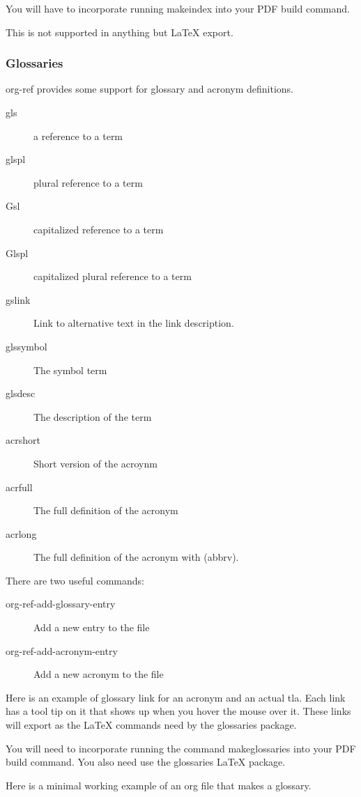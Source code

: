 \documentclass[11pt]{article}
\begin{document}
{You will have to incorporate running makeindex into your PDF build command.

This is not supported in anything but \LaTeX{} export.

\subsubsection{Glossaries}
\label{sec-3-3-5}

org-ref provides some support for glossary and acronym definitions.
\begin{description}
\item[{gls}] a reference to a term
\item[{glspl}] plural reference to a term
\item[{Gsl}] capitalized reference to a term
\item[{Glspl}] capitalized plural reference to a term
\item[{gslink}] Link to alternative text in the link description.
\item[{glssymbol}] The symbol term
\item[{glsdesc}] The description of the term

\item[{acrshort}] Short version of the acroynm
\item[{acrfull}] The full definition of the acronym
\item[{acrlong}] The full definition of the acronym with (abbrv).
\end{description}

There are two useful commands:
\begin{description}
\item[{org-ref-add-glossary-entry}] Add a new entry to the file
\item[{org-ref-add-acronym-entry}] Add a new acronym to the file
\end{description}

Here is an example of glossary link for an \gls{acronym} and an actual \acrshort{tla}. Each link has a tool tip on it that shows up when you hover the mouse over it. These links will export as the \LaTeX{} commands need by the glossaries package.

You will need to incorporate running the command makeglossaries into your PDF build command. You also need use the glossaries \LaTeX{} package.

Here is a minimal working example of an org file that makes a glossary.

}
\end{document}
